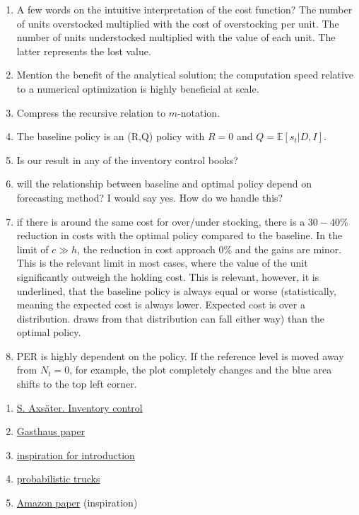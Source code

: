 \documentclass[a4paper,12pt]{article}
\begin{document}
	\begin{enumerate}
		\item A few words on the intuitive interpretation of the cost function? The number of units overstocked multiplied with the cost of overstocking per unit. The number of units understocked multiplied with the value of each unit. The latter represents the lost value.
		\item Mention the benefit of the analytical solution; the computation speed relative to a numerical optimization is highly beneficial at scale.
		\item Compress the recursive relation to $m$-notation. 
		\item The baseline policy is an (R,Q) policy with $R =0$ and $Q = \mathbb{E}[s_t|D,I]$.
		\item Is our result in any of the inventory control books?
		\item will the relationship between baseline and optimal policy depend on forecasting method? I would say yes. How do we handle this?
		
		\item if there is around the same cost for over/under stocking, there is a $30-40\%$ reduction in costs with the optimal policy compared to the baseline. In the limit of $c\gg h$, the reduction in cost approach $0\%$ and the gains are minor. This is the relevant limit in most cases, where the value of the unit significantly outweigh the holding cost. This is relevant, however, it is underlined, that the baseline policy is always equal or worse (statistically, meaning the expected cost is always lower. Expected cost is over a distribution. draws from that distribution can fall either way) than the optimal policy. 
		
		\item PER is highly dependent on the policy. If the reference level is moved away from $N_t =0$, for example, the plot completely changes and the blue area shifts to the top left corner.
	\end{enumerate}
	
	\begin{enumerate}
		\item \href{https://www.academia.edu/27965536/Inventorycontroltextbook_140429044831_phpapp02_1_}{S. Axsäter. Inventory control}
		\item \href{https://proceedings.mlr.press/v151/kan22a/kan22a.pdf}{Gasthaus paper}
		\item \href{https://arxiv.org/pdf/2012.02392}{inspiration for introduction}
		\item \href{https://arxiv.org/pdf/2310.17168}{probabilistic trucks}
		\item \href{https://arxiv.org/pdf/2310.16096}{Amazon paper} (inspiration)
	\end{enumerate}
	
	\newpage
	\begin{appendices}
		
		
		
	\end{appendices}
	
	
	
	
	
	
\end{document}
